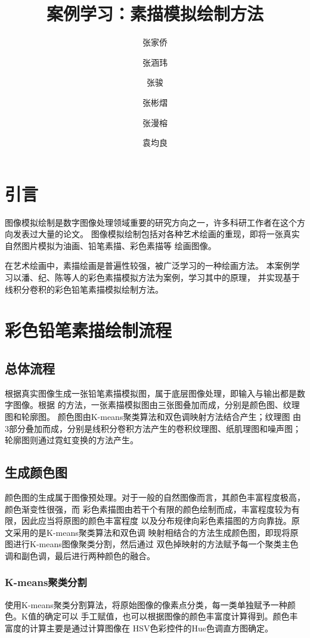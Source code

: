 \documentclass[UTF8, twocolumn]{ctexart}
\title{案例学习：素描模拟绘制方法}
\author{张家侨 \and 张涵玮 \and 张骏 \and 张彬熠 \and 张漫榕 \and 袁均良}
\begin{document}
  \maketitle

  \section{引言}
    图像模拟绘制是数字图像处理领域重要的研究方向之一，许多科研工作者在这个方向发表过大量的论文。
    图像模拟绘制包括对各种艺术绘画的重现，即将一张真实自然图片模拟为油画、铅笔素描、彩色素描等
    绘画图像。
    \par
    在艺术绘画中，素描绘画是普遍性较强，被广泛学习的一种绘画方法。
    本案例学习以潘、纪、陈等人\cite{ji}的彩色素描模拟方法为案例，学习其中的原理，
    并实现基于线积分卷积的彩色铅笔素描模拟绘制方法。

  \section{彩色铅笔素描绘制流程}

    \subsection{总体流程}
    根据真实图像生成一张铅笔素描模拟图，属于底层图像处理，即输入与输出都是数字图像。根据
    \cite{ji}的方法，一张素描模拟图由三张图叠加而成，分别是颜色图、纹理图和轮廓图。
    颜色图由K-means聚类算法\cite{kmeans}和双色调映射方法\cite{duotones}结合产生；纹理图
    由3部分叠加而成，分别是线积分卷积方法\cite{lic}产生的卷积纹理图、纸肌理图和噪声图；
    轮廓图则通过霓虹变换\cite{outline}的方法产生。

    \subsection{生成颜色图}
    颜色图的生成属于图像预处理。对于一般的自然图像而言，其颜色丰富程度极高，颜色渐变性很强，而
    彩色素描图由若干个有限的颜色绘制而成，丰富程度较为有限，因此应当将原图的颜色丰富程度
    以及分布规律向彩色素描图的方向靠拢。原文采用的是K-means聚类算法\cite{kmeans}和双色调
    映射\cite{duotones}相结合的方法生成颜色图，即现将原图进行K-means图像聚类分割，然后通过
    双色掉映射的方法赋予每一个聚类主色调和副色调，最后进行两种颜色的融合。

      \subsubsection{K-means聚类分割}
      使用K-means聚类分割算法，将原始图像的像素点分类，每一类单独赋予一种颜色。K值的确定可以
      手工赋值，也可以根据图像的颜色丰富度计算得到。颜色丰富度的计算主要是通过计算图像在
      HSV色彩控件的Hue色调直方图确定。
\end{document}
